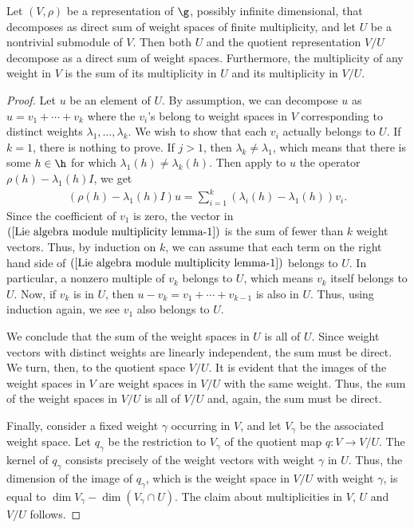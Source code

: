 \begin{lemma}\label{Lie algebra module multiplicity lemma}
Let $(V,\rho)$ be a representation of $\g$, possibly infinite dimensional, that decomposes as direct sum of weight spaces of finite multiplicity, and let $U$ be a nontrivial submodule of $V$. Then both $U$ and the quotient representation $V/U$ decompose as a direct sum of weight spaces. Furthermore, the multiplicity of any weight in $V$ is the sum of its multiplicity in $U$ and its multiplicity in $V/U$.
\end{lemma}
\begin{proof}
Let $u$ be an element of $U$. By assumption, we can decompose $u$ as $u=v_1+\cdots+v_k$ where the $v_i$'s belong to weight spaces in $V$ corresponding to distinct weights $\lambda_1,\dots,\lambda_k$. We wish to show that each $v_i$ actually belongs to $U$. If $k=1$, there is nothing to prove. If $j>1$, then $\lambda_k\neq\lambda_1$, which means that there is some $h\in\h$ for which $\lambda_1(h)\neq\lambda_k(h)$. Then apply to $u$ the operator $\rho(h)-\lambda_1(h)I$, we get
\begin{align}\label{Lie algebra module multiplicity lemma-1}
(\rho(h)-\lambda_1(h)I)u=\sum_{i=1}^{k}(\lambda_i(h)-\lambda_1(h))v_i.
\end{align}
Since the coefficient of $v_1$ is zero, the vector in $(\ref{Lie algebra module multiplicity lemma-1})$ is the sum of fewer than $k$ weight vectors. Thus, by induction on $k$, we can assume that each term on the right hand side of $(\ref{Lie algebra module multiplicity lemma-1})$ belongs to $U$. In particular, a nonzero multiple of $v_k$ belongs to $U$, which means $v_k$ itself belongs to $U$. Now, if $v_k$ is in $U$, then $u-v_k=v_1+\cdots+v_{k-1}$ is also in $U$. Thus, using induction again, we see $v_1$ also belongs to $U$.\par
We conclude that the sum of the weight spaces in $U$ is all of $U$. Since weight vectors with distinct weights are linearly independent, the sum must be direct. We turn, then, to the quotient space $V/U$. It is evident that the images of the weight spaces in $V$ are weight spaces in $V/U$ with the same weight. Thus, the sum of the weight spaces in $V/U$ is all of $V/U$ and, again, the sum must be direct.\par
Finally, consider a fixed weight $\gamma$ occurring in $V$, and let $V_\gamma$ be the associated weight space. Let $q_\gamma$ be the restriction to $V_\gamma$ of the quotient map $q:V\to V/U$. The kernel of $q_\gamma$ consists precisely of the weight vectors with weight $\gamma$ in $U$. Thus, the dimension of the image of $q_\gamma$, which is the weight space in $V/U$ with weight $\gamma$, is equal to $\dim V_\gamma-\dim(V_\gamma\cap U)$. The claim about multiplicities in $V$, $U$ and $V/U$ follows.
\end{proof}
